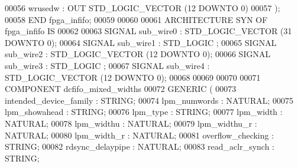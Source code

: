 \begin{DoxyCode}
{00056         \textcolor{vhdlchar}{wrusedw}     \textcolor{vhdlchar}{:} \textcolor{keywordflow}{OUT} \textcolor{comment}{STD\_LOGIC\_VECTOR} \textcolor{vhdlchar}{(}\textcolor{vhdllogic}{}\textcolor{vhdllogic}{12} \textcolor{keywordflow}{DOWNTO} \textcolor{vhdllogic}{}\textcolor{vhdllogic}{0}\textcolor{vhdlchar}{)}
00057     \textcolor{vhdlchar}{)};
00058 \textcolor{keywordflow}{END} \textcolor{vhdlchar}{fpga\_infifo};
00059 
00060 
00061 \textcolor{keywordflow}{ARCHITECTURE} SYN \textcolor{keywordflow}{OF} fpga_infifo IS
00062 
00063     \textcolor{keywordflow}{SIGNAL} \textcolor{vhdlchar}{sub_wire0}    \textcolor{vhdlchar}{:} \textcolor{comment}{STD\_LOGIC\_VECTOR} \textcolor{vhdlchar}{(}\textcolor{vhdllogic}{}\textcolor{vhdllogic}{31} \textcolor{keywordflow}{DOWNTO} \textcolor{vhdllogic}{}\textcolor{vhdllogic}{0}\textcolor{vhdlchar}{)};
00064     \textcolor{keywordflow}{SIGNAL} \textcolor{vhdlchar}{sub_wire1}    \textcolor{vhdlchar}{:} \textcolor{comment}{STD\_LOGIC} ;
00065     \textcolor{keywordflow}{SIGNAL} \textcolor{vhdlchar}{sub_wire2}    \textcolor{vhdlchar}{:} \textcolor{comment}{STD\_LOGIC\_VECTOR} \textcolor{vhdlchar}{(}\textcolor{vhdllogic}{}\textcolor{vhdllogic}{12} \textcolor{keywordflow}{DOWNTO} \textcolor{vhdllogic}{}\textcolor{vhdllogic}{0}\textcolor{vhdlchar}{)};
00066     \textcolor{keywordflow}{SIGNAL} \textcolor{vhdlchar}{sub_wire3}    \textcolor{vhdlchar}{:} \textcolor{comment}{STD\_LOGIC} ;
00067     \textcolor{keywordflow}{SIGNAL} \textcolor{vhdlchar}{sub_wire4}    \textcolor{vhdlchar}{:} \textcolor{comment}{STD\_LOGIC\_VECTOR} \textcolor{vhdlchar}{(}\textcolor{vhdllogic}{}\textcolor{vhdllogic}{12} \textcolor{keywordflow}{DOWNTO} \textcolor{vhdllogic}{}\textcolor{vhdllogic}{0}\textcolor{vhdlchar}{)};
00068 
00069 
00070 
00071     \textcolor{keywordflow}{COMPONENT} dcfifo\_mixed\_widths
00072     \textcolor{keywordflow}{GENERIC} (
00073         intended\_device\_family      : \textcolor{comment}{STRING};
00074         lpm\_numwords        : \textcolor{comment}{NATURAL};
00075         lpm\_showahead       : \textcolor{comment}{STRING};
00076         lpm\_type        : \textcolor{comment}{STRING};
00077         lpm\_width       : \textcolor{comment}{NATURAL};
00078         lpm\_widthu      : \textcolor{comment}{NATURAL};
00079         lpm\_widthu\_r        : \textcolor{comment}{NATURAL};
00080         lpm\_width\_r     : \textcolor{comment}{NATURAL};
00081         overflow\_checking       : \textcolor{comment}{STRING};
00082         rdsync\_delaypipe        : \textcolor{comment}{NATURAL};
00083         read\_aclr\_synch     : \textcolor{comment}{STRING};
}
\end{DoxyCode}
